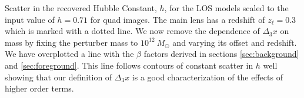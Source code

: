 \label{toyhd3x} Scatter in the recovered Hubble Constant, $h$, for the LOS models scaled to the input value of $h=0.71$ for quad images. The main lens has a redshift of $z_\ell = 0.3$ which is marked with a dotted line. We now remove the dependence of $\Delta_3 x$ on mass by fixing the perturber mass to $10^{12}~ M_\odot$ and varying its offset and redshift. We have overplotted a line with the $\beta$ factors derived in sections \ref{sec:background} and \ref{sec:foreground}. This line follows contours of constant scatter in $h$ well showing that our definition of $\Delta_3 x$ is a good characterization of the effects of higher order terms. 
  